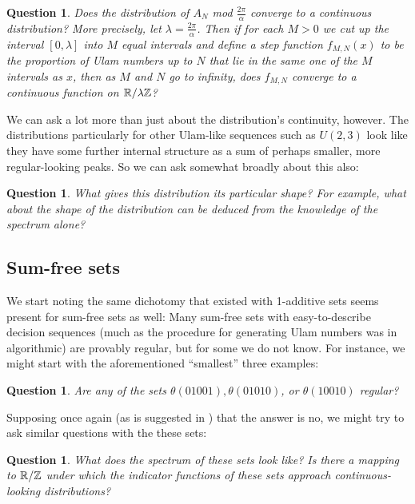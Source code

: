 \documentclass{article}
\newtheorem{question}[theorem]{Question}
\theoremstyle{definition}
\theoremstyle{remark}
\numberwithin{equation}{section}
\begin{document}
\begin{question}\label{qn:continuity}
  Does the distribution of $A_N$ mod $\frac{2\pi}{\alpha}$ converge to
  a continuous distribution?  More precisely, let
  $\lambda = \frac{2\pi}{\alpha}$.  Then if for each $M > 0$ we cut up
  the interval $[0,\lambda]$ into $M$ equal intervals and define a
  step function $f_{M,N}(x)$ to be the proportion of Ulam numbers up
  to $N$ that lie in the same one of the $M$ intervals as $x$, then as
  $M$ and $N$ go to infinity, does $f_{M,N}$ converge to a continuous
  function on $\mathbb{R}/\lambda\mathbb{Z}$?
\end{question}

We can ask a lot more than just about the distribution's continuity,
however.  The distributions particularly for other Ulam-like sequences
such as $U(2,3)$ look like they have some further internal structure
as a sum of perhaps smaller, more regular-looking peaks.  So we can
ask somewhat broadly about this also: 

\begin{question}\label{qn:shape}
  What gives this distribution its particular shape?  For example,
  what about the shape of the distribution can be deduced from the
  knowledge of the spectrum alone?
\end{question}

\subsection{Sum-free sets}

We start noting the same dichotomy that existed with 1-additive sets
seems present for sum-free sets as well: Many sum-free sets with
easy-to-describe decision sequences (much as the procedure for
generating Ulam numbers was in algorithmic) are provably regular, but
for some we do not know.  For instance, we might start with the
aforementioned ``smallest'' three examples: 

\begin{question}\label{qn:sumfree_regularity}
  Are any of the sets $\theta(01001), \theta(01010)$, or
  $\theta(10010)$ regular?
\end{question}

Supposing once again (as is suggested in
\cite{difference_density_calkin}) that the answer is no, we might try
to ask similar questions with the these sets:

\begin{question}\label{qn:spectrum}
  What does the spectrum of these sets look like?  Is there a mapping
  to $\mathbb{R}/\mathbb{Z}$ under which the indicator functions of these sets
  approach continuous-looking distributions?
\end{question}
\end{document}
